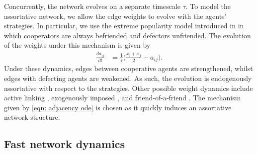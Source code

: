 \documentclass[10pt]{article}
\begin{document}
Concurrently, the network evolves on a separate timescale $\tau$. To model the assortative network, we allow the edge weights to evolve with the agents' strategies. In particular, we use the extreme popularity model introduced in \cite{bara_enabling_2022} in which cooperators are always befriended and defectors unfriended. The evolution of the weights under this mechanism is given by
\begin{align}\label{eqn: adjacency ode}
  \frac{da_{ij}}{dt} &= \frac{1}{\tau}\bigg(\frac{x_i+x_j}{2} - a_{ij}\bigg).
\end{align}
Under these dynamics, edges between cooperative agents are strengthened, whilst edges with defecting agents are weakened. As such, the evolution is endogenously assortative with respect to the strategies. Other possible weight dynamics include active linking \cite{pacheco_active_2006}, exogenously imposed \cite{li_evolution_2020}, and friend-of-a-friend \cite{nugent_evolving_2023}. The mechanism given by \ref{eqn: adjacency ode} is chosen as it quickly induces an assortative network structure.

\subsection{Fast network dynamics}
\end{document}
